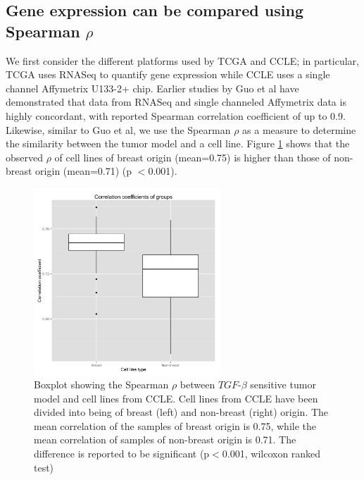 \documentclass[a4paper,12pt]{article}
\begin{document}
\subsection{Gene expression can be compared using Spearman $\rho$}
We first consider the different platforms used by TCGA and CCLE; in
particular, TCGA uses RNASeq to quantify gene expression while CCLE
uses a single channel Affymetrix U133-2+ chip. Earlier studies by Guo
et al \cite{Guo2013} have demonstrated that data from RNASeq and single
channeled Affymetrix data is highly concordant, with reported Spearman
correlation coefficient of up to 0.9. Likewise, similar to Guo et al,
we use the Spearman $\rho$ as a measure to determine the similarity
between the tumor model and a cell line. Figure \ref{rho} shows
that the observed $\rho$ of cell lines of breast origin (mean=0.75) is higher than
those of non-breast origin (mean=0.71) (p $<$0.001).
\begin{figure}[b!]
\centering
\includegraphics[width=7cm]{correlations.png}
\caption[Boxplot showing Spearman $\rho$ of cell lines from breast and
non-breast origin]{Boxplot showing the Spearman $\rho$ between
  $\textit{TGF}$-$\beta$ sensitive tumor model and cell lines from
  CCLE. Cell lines from CCLE have been divided into being of breast
  (left) and non-breast (right) origin. The mean correlation of the
  samples of breast origin is 0.75, while the mean correlation of
  samples of non-breast origin is 0.71. The difference is reported to
  be significant (p$<$0.001, wilcoxon ranked test)}
\label{rho}
\end{figure}
\end{document}
